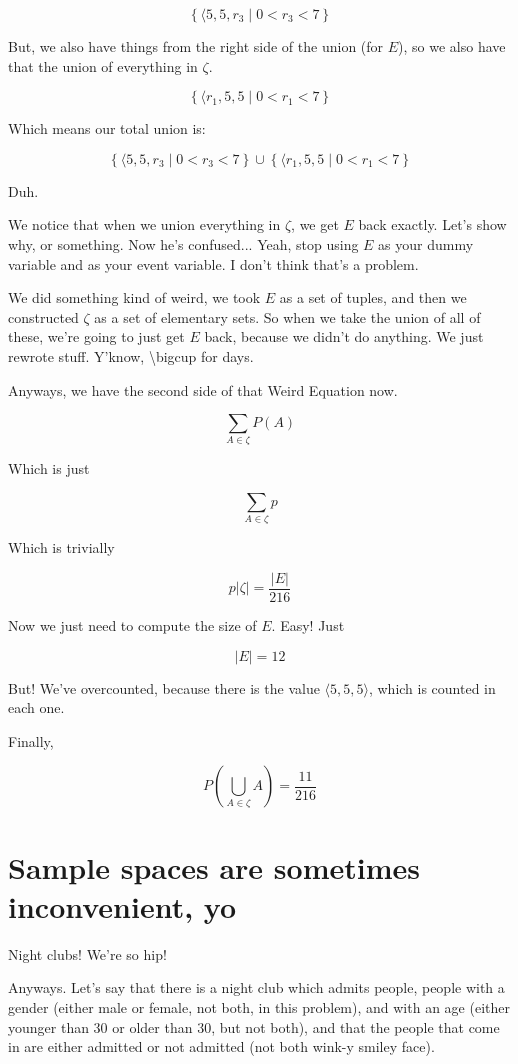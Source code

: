 \documentclass{article}
\begin{document}
\[
\left\{\langle 5,5,r_3\mid 0<r_3<7\right\}
\]

But, we also have things from the right side of the union (for $E$),
so we also have that the union of everything in $\zeta$.

\[
\left\{\langle r_1,5,5\mid 0<r_1<7\right\}
\]

Which means our total union is:

\[
\left\{\langle 5,5,r_3\mid 0<r_3<7\right\}
\cup
\left\{\langle r_1,5,5\mid 0<r_1<7\right\}
\]

Duh.

We notice that when we union everything in $\zeta$, we get $E$ back
exactly. Let's show why, or something. Now he's confused... Yeah, stop
using $E$ as your dummy variable and as your event variable. I don't
think that's a problem.

We did something kind of weird, we took $E$ as a set of tuples, and
then we constructed $\zeta$ as a set of elementary sets. So when we
take the union of all of these, we're going to just get $E$ back,
because we didn't do anything. We just rewrote stuff. Y'know,
\textbackslash bigcup for days.

Anyways, we have the second side of that Weird Equation
\texttrademark now.

\[
\sum\limits_{A\in\zeta}P(A)
\]

Which is just

\[
\sum\limits_{A\in\zeta} p
\]

Which is trivially

\[
p\left|\zeta\right| = \frac{|E|}{216}
\]

Now we just need to compute the size of $E$. Easy! Just

\[
|E| = 12
\]

But! We've overcounted, because there is the value
$\langle{}5,5,5\rangle$, which is counted in each one.

Finally,

\[
P\left(\bigcup\limits_{A\in\zeta} A\right) = \frac{11}{216}
\]

\section*{Sample spaces are sometimes inconvenient, yo}

Night clubs! We're so hip!

Anyways. Let's say that there is a night club which admits people,
people with a gender (either male or female, not both, in this
problem), and with an age (either younger than 30 or older than 30,
but not both), and that the people that come in are either admitted or
not admitted (not both wink-y smiley face).
\end{document}
